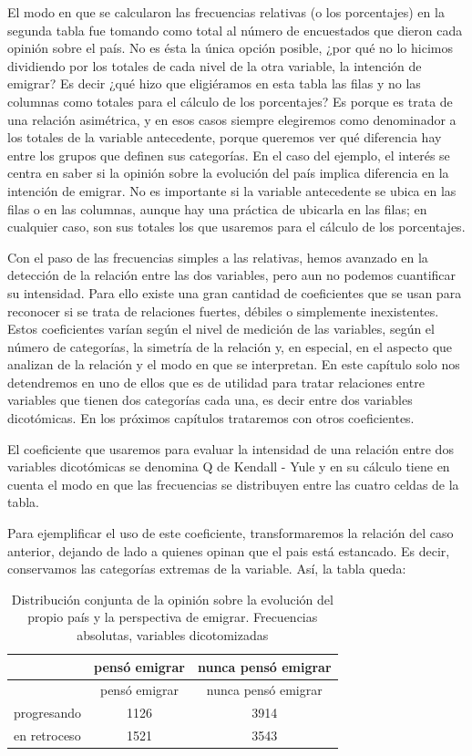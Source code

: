 \documentclass[]{book}
\begin{document}
El modo en que se calcularon las frecuencias relativas (o los
porcentajes) en la segunda tabla fue tomando como total al número de encuestados que dieron cada opinión sobre el país. No es ésta la única opción posible, ¿por qué no lo hicimos dividiendo por los totales de cada nivel de la otra variable, la intención de emigrar?
Es decir ¿qué hizo que eligiéramos en esta tabla las filas y no las
columnas como totales para el cálculo de los porcentajes? Es porque es trata de una relación asimétrica, y en esos casos siempre elegiremos como denominador a los totales de la variable
antecedente, porque queremos ver qué diferencia hay entre los grupos que definen sus categorías. En el caso del ejemplo, el interés se centra en saber si la opinión sobre la evolución del país implica diferencia en la intención de emigrar. No es importante si la variable antecedente se ubica en las filas o en las columnas, aunque hay una práctica de ubicarla en las filas; en cualquier caso, son sus totales los que usaremos para el cálculo de los porcentajes.

Con el paso de las frecuencias simples a las relativas, hemos avanzado en la detección de la relación entre las dos variables, pero aun no podemos cuantificar su intensidad. Para ello existe una gran cantidad de coeficientes que se usan para reconocer si se trata de relaciones fuertes, débiles o simplemente inexistentes. Estos coeficientes varían según el nivel de medición de las variables, según el número de categorías, la simetría de la relación y, en especial, en el aspecto que analizan de la relación y el modo en que se interpretan. En este capítulo solo nos detendremos en uno de ellos que es de utilidad para tratar relaciones entre variables que tienen dos categorías cada una, es decir entre dos variables dicotómicas. En los próximos capítulos trataremos con otros coeficientes.

El coeficiente que usaremos para evaluar la intensidad de una relación entre dos variables dicotómicas se denomina Q de Kendall - Yule y en su cálculo tiene en cuenta el modo en que las frecuencias se distribuyen entre las cuatro celdas de la tabla.

Para ejemplificar el uso de este coeficiente, transformaremos la
relación del caso anterior, dejando de lado a quienes opinan que el pais está estancado. Es decir, conservamos las categorías extremas de la variable. Así, la tabla queda:

\begin{longtable}[]{@{}lcc@{}}
\caption{\label{tab:unnamed-chunk-117}Distribución conjunta de la opinión sobre la evolución del propio país y la perspectiva de emigrar. Frecuencias absolutas, variables dicotomizadas}\tabularnewline
\toprule
& pensó emigrar & nunca pensó emigrar\tabularnewline
\midrule
\endfirsthead
\toprule
& pensó emigrar & nunca pensó emigrar\tabularnewline
\midrule
\endhead
progresando & 1126 & 3914\tabularnewline
en retroceso & 1521 & 3543\tabularnewline
\bottomrule
\end{longtable}
\end{document}
